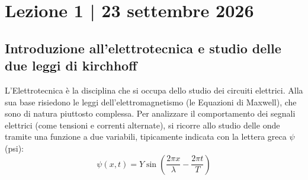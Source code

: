 \documentclass[12pt, a4paper]{article}
\begin{document}
	\section*{Lezione 1 | 23 settembre 2026} %
	\subsection*{Introduzione all'elettrotecnica e studio delle due leggi di kirchhoff} %
	
	L'Elettrotecnica è la disciplina che si occupa dello studio dei circuiti elettrici. Alla sua base risiedono le leggi dell'elettromagnetismo (le Equazioni di Maxwell), che sono di natura piuttosto complessa. Per analizzare il comportamento dei segnali elettrici (come tensioni e correnti alternate), si ricorre allo studio delle onde tramite una funzione a due variabili, tipicamente indicata con la lettera greca $\psi$ (psi):
	\[
	\psi(x,t) = Y \sin\left(\frac{2\pi x}{\lambda} - \frac{2\pi t}{T}\right)
	\]
	
\end{document}
